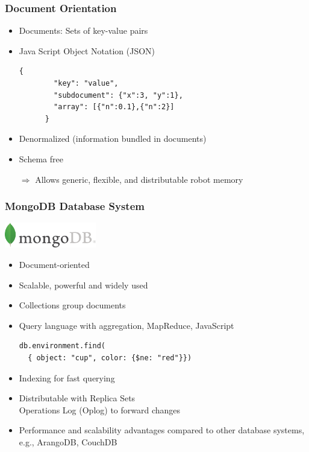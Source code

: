 \begin{frame}[fragile]
  \frametitle{Document Orientation}

  \begin{itemize}
  \item Documents: Sets of key-value pairs
  \item Java Script Object Notation (JSON)
    \begin{lstlisting}[style=SmallJSON,linewidth=8.5cm,
      label=lst:json,
      framexleftmargin=1pt, xleftmargin=0pt,
      morekeywords={}, numbers=none]
      {
        "key": "value",
        "subdocument": {"x":3, "y":1},
        "array": [{"n":0.1},{"n":2}]
      }
    \end{lstlisting}
  \item Denormalized (information bundled in documents)
  \item Schema free
  \end{itemize}
  \begin{itemize}
  \item[$\Rightarrow$] Allows generic, flexible, and distributable robot memory
  \end{itemize}
\end{frame}

\begin{frame}[fragile]
  \frametitle{MongoDB Database System}
  \hfill\includegraphics[width=0.3\textwidth]{../thesis/img/mongodb}
  \begin{itemize}
    \item Document-oriented
    \item Scalable, powerful and widely used
    \item Collections group documents
    \item Query language with aggregation, MapReduce, JavaScript %
\begin{lstlisting}[style=SmallJSON,linewidth=8.5cm,
  framexleftmargin=2pt, xleftmargin=10pt,
 morekeywords={}, numbers=none]
db.environment.find(
  { object: "cup", color: {$ne: "red"}})
\end{lstlisting}%
    \item Indexing for fast querying
    \item Distributable with Replica Sets\\ %
      Operations Log (Oplog) to forward changes
    \item Performance and scalability advantages compared to other database systems, e.g., ArangoDB, CouchDB\\\cite{arango-vs-mongo,db-comparison}
  \end{itemize}
\end{frame}

